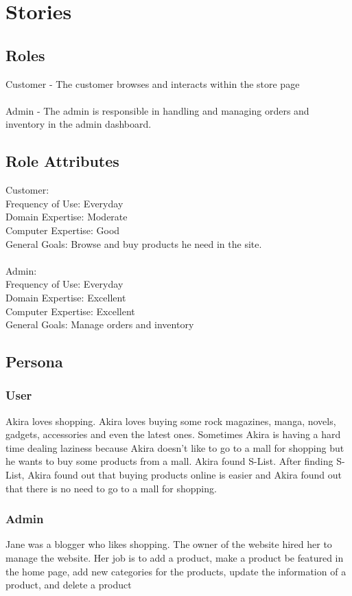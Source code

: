 \documentclass{report}
\begin{document}
\chapter{Stories}
\label{chpt: Stories}
\section{Roles}
Customer - The customer browses and interacts within the store page \\ \\
Admin - The admin is responsible in handling and managing orders and inventory in the admin dashboard. 

\section{Role Attributes}
Customer: \\
Frequency of Use: Everyday \\
Domain Expertise: Moderate \\
Computer Expertise: Good \\
General Goals: Browse and buy products he need in the site. \\ \\
Admin: \\
Frequency of Use: Everyday \\
Domain Expertise: Excellent \\
Computer Expertise: Excellent \\
General Goals: Manage orders and inventory \\

\section{Persona}
\subsection{User}
Akira loves shopping. Akira loves buying some rock magazines, manga, novels, gadgets, accessories and even the latest ones. Sometimes Akira is having a hard time dealing laziness because Akira doesn’t like to go to a mall for shopping but he wants to buy some products from a mall. Akira found S-List. After finding S-List, Akira found out that buying products online is easier and Akira found out that there is no need to go to a mall for shopping.

\subsection{Admin}
Jane was a blogger who likes shopping. The owner of the website hired her to manage the website. Her job is to add a product, make a product be featured in the home page, add new categories for the products, update the information of a product, and delete a product
\end{document}
